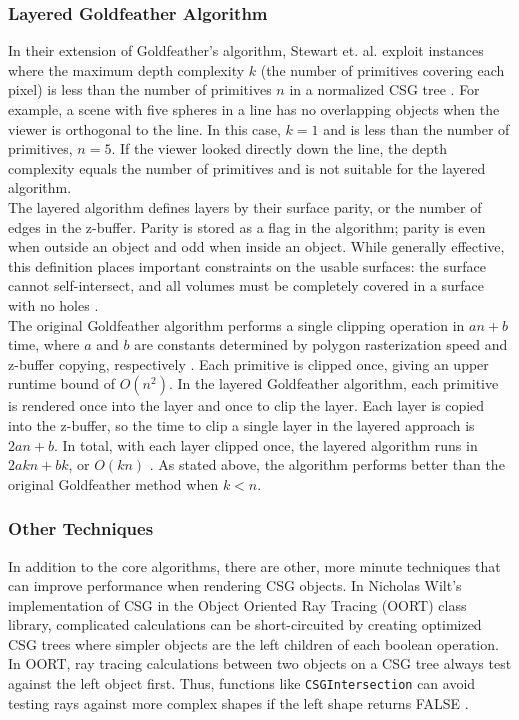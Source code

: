 \documentclass[12pt]{article}
\begin{document}
\begin{doublespace}
\subsubsection{Layered Goldfeather Algorithm}
In their extension of Goldfeather's algorithm, Stewart et. al. exploit instances where the maximum depth complexity $k$ (the number of primitives covering each pixel) is less than the number of primitives $n$ in a normalized CSG tree \cite{layered_gold}. For example, a scene with five spheres in a line has no overlapping objects when the viewer is orthogonal to the line. In this case, $k=1$ and is less than the number of primitives, $n=5$. If the viewer looked directly down the line, the depth complexity equals the number of primitives and is not suitable for the layered algorithm.\\

The layered algorithm defines layers by their surface parity, or the number of edges in the z-buffer. Parity is stored as a flag in the algorithm; parity is even when outside an object and odd when inside an object. While generally effective, this definition places important constraints on the usable surfaces: the surface cannot self-intersect, and all volumes must be completely covered in a surface with no holes \cite{layered_gold}.\\

The original Goldfeather algorithm performs a single clipping operation in $an+b$ time, where $a$ and $b$ are constants determined by polygon rasterization speed and z-buffer copying, respectively \cite{layered_gold}. Each primitive is clipped once, giving an upper runtime bound of $O(n^2)$. In the layered Goldfeather algorithm, each primitive is rendered once into the layer and once to clip the layer. Each layer is copied into the z-buffer, so the time to clip a single layer in the layered approach is $2an+b$. In total, with each layer clipped once, the layered algorithm runs in $2akn+bk$, or $O(kn)$ \cite{layered_gold}. As stated above, the algorithm performs better than the original Goldfeather method when $k<n$.

\subsubsection{Other Techniques}
In addition to the core algorithms, there are other, more minute techniques that can improve performance when rendering CSG objects. In Nicholas Wilt's implementation of CSG in the Object Oriented Ray Tracing (OORT) class library, complicated calculations can be short-circuited by creating optimized CSG trees where simpler objects are the left children of each boolean operation. In OORT, ray tracing calculations between two objects on a CSG tree always test against the left object first. Thus, functions like \texttt{CSGIntersection} can avoid testing rays against more complex shapes if the left shape returns FALSE \cite{raytrace}.\\


\end{doublespace}
\end{document}
